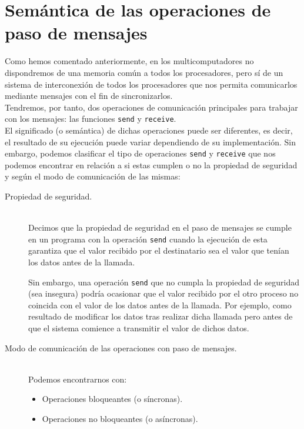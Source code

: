 \section{Semántica de las operaciones de paso de mensajes}
Como hemos comentado anteriormente, en los multicomputadores no dispondremos de una memoria común a todos los procesadores, pero sí de un sistema de interconexión de todos los procesadores que nos permita comunicarlos mediante mensajes con el fin de sincronizarlos.\\

Tendremos, por tanto, dos operaciones de comunicación principales para trabajar con los mensajes: las funciones \verb|send| y \verb|receive|.\\

El significado (o semántica) de dichas operaciones puede ser diferentes, es decir, el resultado de su ejecución puede variar dependiendo de su implementación. Sin embargo, podemos clasificar el tipo de operaciones \verb|send| y \verb|receive| que nos podemos encontrar en relación a si estas cumplen o no la propiedad de seguridad y según el modo de comunicación de las mismas:

\begin{description}
    \item [Propiedad de seguridad.]~\\
        Decimos que la propiedad de seguridad en el paso de mensajes se cumple en un programa con la operación \verb|send| cuando la ejecución de esta garantiza que el valor recibido por el destinatario sea el valor que tenían los datos antes de la llamada.

        Sin embargo, una operación \verb|send| que no cumpla la propiedad de seguridad (sea insegura) podría ocasionar que el valor recibido por el otro proceso no coincida con el valor de los datos antes de la llamada. Por ejemplo, como resultado de modificar los datos tras realizar dicha llamada pero antes de que el sistema comience a transmitir el valor de dichos datos.
    \item [Modo de comunicación de las operaciones con paso de mensajes.]~\\
        Podemos encontrarnos con:
        \begin{itemize}
            \item Operaciones bloqueantes (o síncronas).
            \item Operaciones no bloqueantes (o asíncronas).
        \end{itemize}
\end{description}

